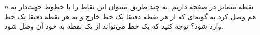 \p
   $n$
   نقطه متمایز
   در صفحه داریم. به چند طریق میتوان این نقاط را با خطوط جهت‌دار به هم وصل کرد به گونه‌ای که از هر نقطه دقیقا یک خط خارج و به هر نقطه دقیقا یک خط وارد شود؟ توجه کنید که یک خط می‌تواند از یک نقطه به خود آن وصل شود. 

